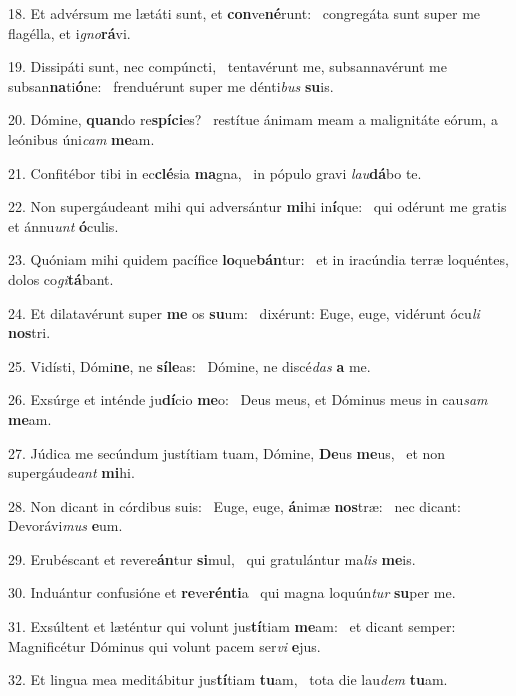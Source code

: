 18. Et advérsum me lætáti sunt, et \textbf{con}ve\textbf{né}runt: \ast\  congregáta sunt super me flagélla, et i\textit{gno}\textbf{rá}vi.\

19. Dissipáti sunt, nec compúncti, \dag\  tentavérunt me, subsannavérunt me subsan\textbf{na}ti\textbf{ó}ne: \ast\  frenduérunt super me dénti\textit{bus} \textbf{su}is.\

20. Dómine, \textbf{quan}do re\textbf{spí}\textbf{ci}es? \ast\  restítue ánimam meam a malignitáte eórum, a leónibus úni\textit{cam} \textbf{me}am.\

21. Confitébor tibi in ec\textbf{clé}sia \textbf{ma}gna, \ast\  in pópulo gravi \textit{lau}\textbf{dá}bo te.\

22. Non supergáudeant mihi qui adversántur \textbf{mi}hi in\textbf{í}que: \ast\  qui odérunt me gratis et ánnu\textit{unt} \textbf{ó}culis.\

23. Quóniam mihi quidem pacífice \textbf{lo}que\textbf{bán}tur: \ast\  et in iracúndia terræ loquéntes, dolos co\textit{gi}\textbf{tá}bant.\

24. Et dilatavérunt super \textbf{me} os \textbf{su}um: \ast\  dixérunt: Euge, euge, vidérunt ócu\textit{li} \textbf{nos}tri.\

25. Vidísti, Dómi\textbf{ne}, ne \textbf{sí}\textbf{le}as: \ast\  Dómine, ne discé\textit{das} \textbf{a} me.\

26. Exsúrge et inténde ju\textbf{dí}cio \textbf{me}o: \ast\  Deus meus, et Dóminus meus in cau\textit{sam} \textbf{me}am.\

27. Júdica me secúndum justítiam tuam, Dómine, \textbf{De}us \textbf{me}us, \ast\  et non supergáude\textit{ant} \textbf{mi}hi.\

28. Non dicant in córdibus suis: \dag\  Euge, euge, \textbf{á}nimæ \textbf{nos}træ: \ast\  nec dicant: Devorávi\textit{mus} \textbf{e}um.\

29. Erubéscant et revere\textbf{án}tur \textbf{si}mul, \ast\  qui gratulántur ma\textit{lis} \textbf{me}is.\

30. Induántur confusióne et \textbf{re}ve\textbf{rén}\textbf{ti}a \ast\  qui magna loquún\textit{tur} \textbf{su}per me.\

31. Exsúltent et læténtur qui volunt jus\textbf{tí}tiam \textbf{me}am: \ast\  et dicant semper: Magnificétur Dóminus qui volunt pacem ser\textit{vi} \textbf{e}jus.\

32. Et lingua mea meditábitur jus\textbf{tí}tiam \textbf{tu}am, \ast\  tota die lau\textit{dem} \textbf{tu}am.\

